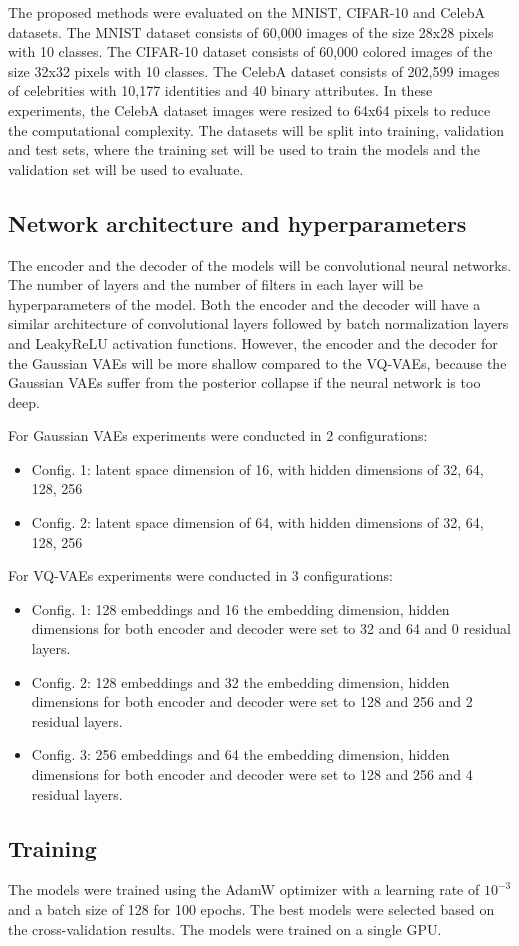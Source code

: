 The proposed methods were evaluated on the MNIST, CIFAR-10 and CelebA datasets. The MNIST dataset consists of 60,000 images of the size 28x28 pixels with 10 classes. The CIFAR-10 dataset consists of 60,000 colored images of the size 32x32 pixels with 10 classes.
The CelebA dataset consists of 202,599 images of celebrities with 10,177 identities and 40 binary attributes. In these experiments, the CelebA dataset images were resized to 64x64 pixels to reduce the computational complexity.
The datasets will be split into training, validation and test sets, where the training set will be used to train the models and the validation set will be used to evaluate.

\subsection{Network architecture and hyperparameters}

The encoder and the decoder of the models will be convolutional neural networks. The number of layers and the number of filters in each layer will be hyperparameters of the model. Both the encoder and the decoder will have a similar architecture of convolutional layers followed by batch normalization layers and LeakyReLU activation functions. However, the encoder and the decoder for the Gaussian VAEs will be more shallow compared to the VQ-VAEs, because the Gaussian VAEs suffer from the posterior collapse if the neural network is too deep. 

For Gaussian VAEs experiments were conducted in 2 configurations:

\begin{itemize}
    \item Config. 1: latent space dimension of 16, with hidden dimensions of 32, 64, 128, 256
    \item Config. 2: latent space dimension of 64, with hidden dimensions of 32, 64, 128, 256
\end{itemize}

For VQ-VAEs experiments were conducted in 3 configurations:

\begin{itemize}
    \item Config. 1: 128 embeddings and 16 the embedding dimension, hidden dimensions for both encoder and decoder were set to 32 and 64 and 0 residual layers.
    \item Config. 2: 128 embeddings and 32 the embedding dimension, hidden dimensions for both encoder and decoder were set to 128 and 256 and 2 residual layers.
    \item Config. 3: 256 embeddings and 64 the embedding dimension, hidden dimensions for both encoder and decoder were set to 128 and 256 and 4 residual layers.
\end{itemize}

\subsection{Training}

The models were trained using the AdamW optimizer with a learning rate of $10^{-3}$ and a batch size of 128 for 100 epochs. The best models were selected based on the cross-validation results. The models were trained on a single GPU.